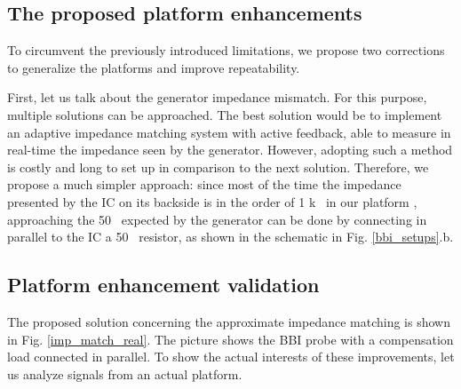 	\subsection{The proposed platform enhancements}
		To circumvent the previously introduced limitations, we propose two corrections to generalize the platforms and improve repeatability.

		First, let us talk about the generator impedance mismatch.
		For this purpose, multiple solutions can be approached.
		The best solution would be to implement an adaptive impedance matching system with active feedback, able to measure in real-time the impedance seen by the generator.
		However, adopting such a method is costly and long to set up in comparison to the next solution.
		Therefore, we propose a much simpler approach: since most of the time the impedance presented by the IC on its backside is in the order of 1 k \textOmega\ in our platform \cite{mybbifdtc2023}, approaching the 50 \textOmega\ expected by the generator can be done by connecting in parallel to the IC a 50 \textOmega\ resistor, as shown in the schematic in Fig. \ref{bbi_setups}.b.

%

	\subsection{Platform enhancement validation}
		
		The proposed solution concerning the approximate impedance matching is shown in Fig. \ref{imp_match_real}.
		The picture shows the BBI probe with a compensation load connected in parallel.
		To show the actual interests of these improvements, let us analyze signals from an actual platform.


